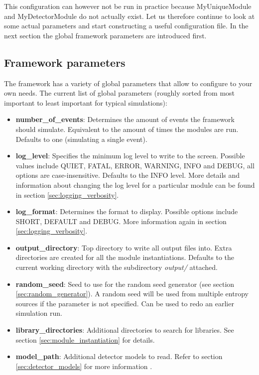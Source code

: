 This configuration can however not be run in practice because MyUniqueModule and MyDetectorModule do not actually exist. Let us therefore continue to look at some actual parameters and start constructing a useful configuration file. In the next section the global framework parameters are introduced first.

\subsection{Framework parameters}
\label{sec:framework_parameters}
The framework has a variety of global parameters that allow to configure \apsq to your own needs. The current list of global parameters (roughly sorted from most important to least important for typical simulations):
\begin{itemize}
\item \textbf{number\_of\_events}: Determines the amount of events the framework should simulate. Equivalent to the amount of times the modules are run. Defaults to one (simulating a single event).
\item \textbf{log\_level}: Specifies the minimum log level to write to the screen. Possible values include QUIET, FATAL, ERROR, WARNING, INFO and DEBUG, all options are case-insensitive. Defaults to the INFO level. More details and information about changing the log level for a particular module can be found in section \ref{sec:logging_verbosity}.
\item \textbf{log\_format}: Determines the format to display. Possible options include SHORT, DEFAULT and DEBUG. More information again in section \ref{sec:logging_verbosity}.
\item \textbf{output\_directory}: Top directory to write all output files into. Extra directories are created for all the module instantiations. Defaults to the current working directory with the subdirectory \textit{output/} attached.
\item \textbf{random\_seed}: Seed to use for the random seed generator (see section \ref{sec:random_generator}). A random seed will be used from multiple entropy sources if the parameter is not specified. Can be used to redo an earlier simulation run.
\item \textbf{library\_directories}: Additional directories to search for libraries. See section \ref{sec:module_instantiation} for details.
\item \textbf{model\_path}: Additional detector models to read. Refer to section \ref{sec:detector_models} for more information .
\end{itemize}

